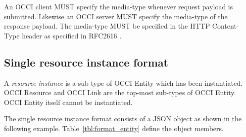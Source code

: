 \documentclass[10pt,a4paper]{article}
\begin{document}
An OCCI client MUST specify the media-type whenever request payload is
submitted. Likewise an OCCI server MUST specify the media-type of the response
payload. The media-type MUST be specified in the HTTP Content-Type header as specified
in RFC2616 \cite{rfc2616}.

\subsection{Single resource instance format}
\label{sec:format_entity}

A {\em resource instance} is a sub-type of OCCI Entity which has been instantiated.
OCCI Resource and OCCI Link are the top-most sub-types of OCCI Entity.
OCCI Entity itself cannot be instantiated.

The single resource instance format consists of a JSON object as shown in the
following example.
Table~\ref{tbl:format_entity} define the object members.
\end{document}
